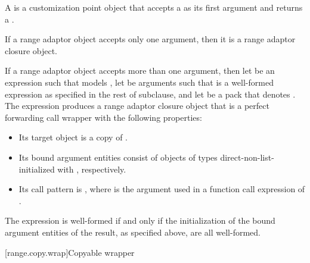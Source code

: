 \pnum
A  is a
customization point object
that accepts a  as its first argument and returns a
.

\pnum
If a range adaptor object accepts only one argument,
then it is a range adaptor closure object.

\pnum
If a range adaptor object  accepts more than one argument,
then let  be an expression
such that  models ,
let  be arguments
such that  is a well-formed expression
as specified in the rest of subclause, and
let  be a pack
that denotes .
The expression  produces a range adaptor closure object 
that is a perfect forwarding call wrapper with the following properties:
\begin{itemize}
\item
Its target object is a copy of .
\item
Its bound argument entities  consist of objects of types  direct-non-list-initialized with , respectively.
\item
Its call pattern is ,
where  is the argument used in a function call expression of .
\end{itemize}
The expression  is well-formed if and only if
the initialization of the bound argument entities of the result,
as specified above, are all well-formed.

[range.copy.wrap]{Copyable wrapper}

